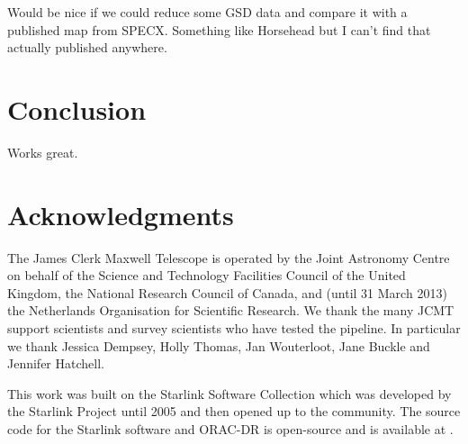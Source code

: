 \documentclass[final,authoryear,5p,times,twocolumn]{elsarticle}
\begin{document}
Would be nice if we could reduce some GSD data and compare it with a
published map from SPECX. Something like Horsehead but I can't find
that actually published anywhere.


\section{Conclusion}

Works great.

\section{Acknowledgments}

The James Clerk Maxwell Telescope is operated by the Joint Astronomy
Centre on behalf of the Science and Technology Facilities Council of
the United Kingdom, the National Research Council of Canada, and
(until 31 March 2013) the Netherlands Organisation for Scientific
Research. We thank the many JCMT support scientists and survey
scientists who have tested the pipeline. In particular we thank
Jessica Dempsey, Holly Thomas, Jan Wouterloot, Jane Buckle and
Jennifer Hatchell.

This work was built on the Starlink Software Collection which was
developed by the Starlink Project until 2005
\citep{1982QJRAS..23..485D,2005ASPC..347...22D} and then opened up to
the community. The source code for the Starlink software and ORAC-DR
is open-source and is available at
.


\end{document}
